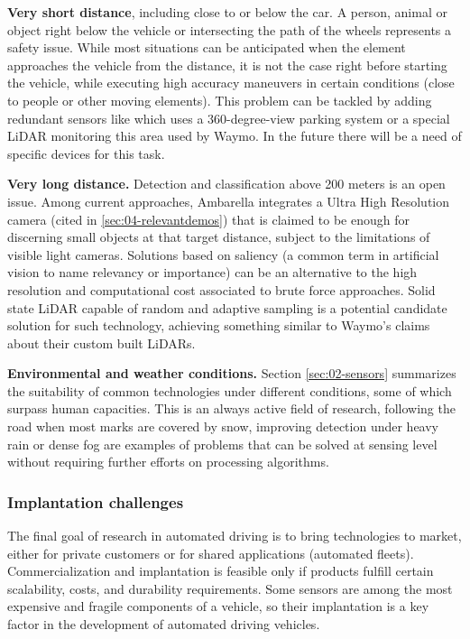 \documentclass[journal]{IEEEtran}
\begin{document}
\textbf{Very short distance}, including close to or below the car.
A person, animal or object right below the vehicle or intersecting 
the path of the wheels represents a safety issue. While most situations
can be anticipated when the element approaches the vehicle from the
distance, it is not the case right before starting the vehicle, 
while executing high accuracy maneuvers in certain conditions 
(close to people or other moving elements).  
This problem can be tackled by adding redundant sensors like \cite{gandhi2006vehicle}
which uses a 360-degree-view parking system or a special LiDAR monitoring this area
used by Waymo.    
In the future there will be a need of specific devices for this task.

\textbf{Very long distance.} 
Detection and classification above 200 meters is an open issue. 
Among current approaches, Ambarella integrates a Ultra High Resolution 
camera (cited in \ref{sec:04-relevantdemos}) that is claimed to be enough
for discerning small objects at that target distance, subject to the 
limitations of visible light cameras.    
Solutions based on saliency (a common term in artificial vision 
\cite{Zhang2016a,Palazzi2018,Duthon2016} to name relevancy or importance) 
can be an alternative to the high resolution and computational cost 
associated to brute force approaches. Solid state LiDAR capable of
random and adaptive sampling is a potential candidate solution for such 
technology, achieving something similar to Waymo's claims about their custom
built LiDARs.

\textbf{Environmental and weather conditions.}    
Section \ref{sec:02-sensors} summarizes the suitability of common 
technologies under different conditions, some of which surpass human 
capacities. 
This is an always active field of research, following the road  when
most marks are covered by snow, improving detection under heavy rain 
or dense fog are examples of problems that can be solved at sensing
level without requiring further efforts on processing algorithms.

\subsubsection{Implantation challenges}

The final goal of research in automated driving is to bring technologies to
market, either for private customers or for shared applications (automated 
fleets). Commercialization and implantation is feasible only if products 
fulfill certain scalability, costs, and durability requirements.
Some sensors are among the most expensive and fragile components of a vehicle,
so their implantation is a key factor in the development of automated driving
vehicles.
\end{document}
